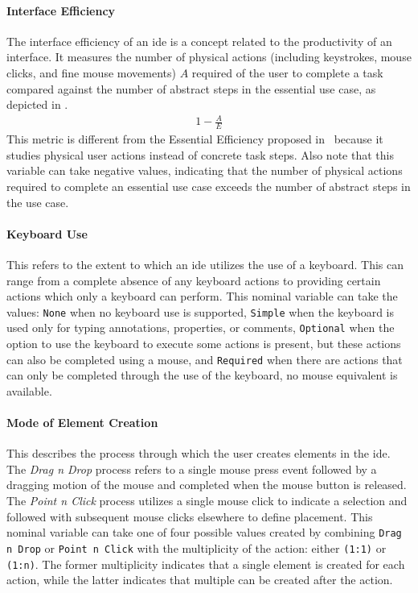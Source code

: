 \paragraph{Interface Efficiency}
The interface efficiency of an \ac{ide} is a concept related to the productivity of an interface.
It measures the number of physical actions (including keystrokes, mouse clicks, and fine mouse movements) $A$ required of the user to complete a task compared against the number of abstract steps in the essential use case, as depicted in .
%
\begin{align}\label{eq:iefficiency}
  1 - \frac{A}{E}
\end{align}
%
This metric is different from the Essential Efficiency proposed in~\cite{constantine1996} because it studies physical user actions instead of concrete task steps.
Also note that this variable can take negative values, indicating that the number of physical actions required to complete an essential use case exceeds the number of abstract steps in the use case.


\paragraph{Keyboard Use}
This refers to the extent to which an \ac{ide} utilizes the use of a keyboard.
This can range from a complete absence of any keyboard actions to providing certain actions which only a keyboard can perform.
This nominal variable can take the values:
\texttt{None} when no keyboard use is supported,
\texttt{Simple} when the keyboard is used only for typing annotations, properties, or comments,
\texttt{Optional} when the option to use the keyboard to execute some actions is present, but these actions can also be completed using a mouse,
and \texttt{Required} when there are actions that can only be completed through the use of the keyboard, no mouse equivalent is available.


\paragraph{Mode of Element Creation}
This describes the process through which the user creates elements in the \ac{ide}.
The \emph{Drag n Drop} process refers to a single mouse press event followed by a dragging motion of the mouse and completed when the mouse button is released.
The \emph{Point n Click} process utilizes a single mouse click to indicate a selection and followed with subsequent mouse clicks elsewhere to define placement.
This nominal variable can take one of four possible values created by
combining \texttt{Drag n Drop} or \texttt{Point n Click} with the
multiplicity of the action: either \texttt{(1:1)} or \texttt{(1:n)}. The
former multiplicity indicates that a single element is created for each
action, while the latter indicates that multiple can be created after the
action.


